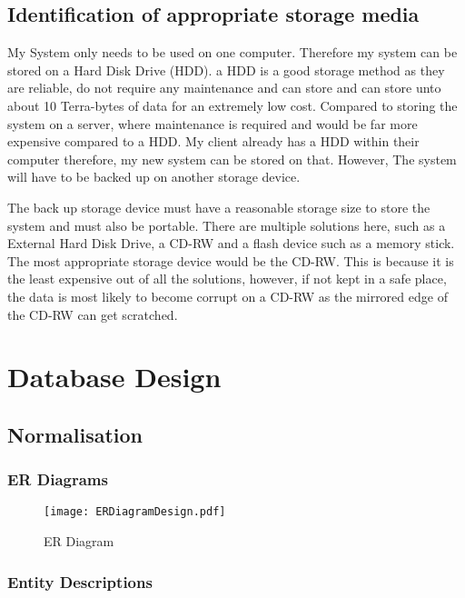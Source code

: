 \subsection{Identification of appropriate storage media}

My System only needs to be used on one computer. Therefore my system can be stored on a Hard Disk Drive (HDD). a HDD is a good storage method as they are reliable, do not require any maintenance and can store and can store unto about 10 Terra-bytes of data for an extremely low cost. Compared to storing the system on a server, where maintenance is required and would be far more expensive compared to a HDD. My client already has a HDD within their computer therefore, my new system can be stored on that. However, The system will have to be backed up on another storage device. \par

The back up storage device must have a reasonable storage size to store the system and must also be portable. There are multiple solutions here, such as a External Hard Disk Drive, a CD-RW and a flash device such as a memory stick.  The most appropriate storage device would be the CD-RW. This is because it is the least expensive out of all the solutions, however, if not kept in a safe place, the data is most likely to become corrupt on a CD-RW as the mirrored edge of the CD-RW can get scratched. \par

\section{Database Design}

\subsection{Normalisation}

\subsubsection{ER Diagrams}

\begin{figure}[H]
\caption{ER Diagram} \label{fig:ER Diagram}
\hfill\texttt{[image: ERDiagramDesign.pdf]}\hspace*{\fill}
\end{figure}

\subsubsection{Entity Descriptions}

